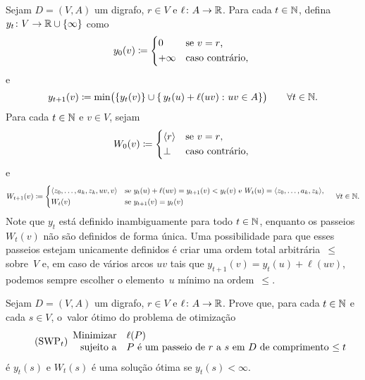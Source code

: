 \documentclass[10pt,reqno]{amsart}
\begin{document}
Sejam \(D = (V,A)\) um digrafo, \(r \in V\) e
\(\ell \colon A \to \mathbb{R}\).  Para cada \(t \in \mathbb{N}\), defina
\(y_t \colon V \to \mathbb{R} \cup \{\infty\}\) como
\begin{equation}
  \label{eq:7}
  y_0(v)
  \coloneqq
  \begin{cases*}
    0       & se \(v = r\),   \\
    +\infty & caso contrário, \\
  \end{cases*}
\end{equation}
e
\begin{equation}
  \label{eq:8}
  y_{t+1}(v)
  \coloneqq
  \min\paren[\big]{
    \set{y_t(v)}
    \cup
    \setst{
      y_t(u) + \ell(uv)
    }{
      uv \in A
    }}
  \qquad
  \forall t \in \Naturals.
\end{equation}
Para cada \(t \in \mathbb{N}\) e \(v \in V\), sejam
\begin{equation}
  \label{eq:9}
  W_0(v)
  \coloneqq
  \begin{cases*}
    \seq{r} & se \(v = r\),   \\
    \bot    & caso contrário, \\
  \end{cases*}
\end{equation}
e
\begin{equation}
  \label{eq:10}
  W_{t+1}(v)
  \coloneqq
  \begin{cases*}
    \seq{z_0,\dotsc,a_k,z_k,uv,v} & se \(y_t(u) + \ell(uv) =
    y_{t+1}(v) < y_t(v)\) e \(W_t(u) = \seq{z_0,\dotsc,a_k,z_k}\), \\
    W_t(v) & se \(y_{t+1}(v) = y_t(v)\) \\
  \end{cases*}
  \quad
  \forall t \in \Naturals.
\end{equation}
Note que \(y_t\) está definido inambiguamente para todo
\(t \in \mathbb{N}\), enquanto os passeios \(W_t(v)\) não são definidos
de forma única.  Uma possibilidade para que esses passeios estejam
unicamente definidos é criar uma ordem total arbitrária~\(\leq\)
sobre~\(V\) e, em caso de vários arcos \(uv\) tais que
\(y_{t+1}(v) = y_t(u) + \ell(uv)\), podemos sempre escolher o
elemento~\(u\) mínimo na ordem~\(\leq\).

\begin{exercise}
  \label{ex:5}
  Sejam \(D = (V,A)\) um digrafo, \(r \in V\) e
  \(\ell \colon A \to \mathbb{R}\).  Prove que, para cada
  \(t \in \mathbb{N}\) e cada \(s \in V\), o~valor ótimo do problema de
  otimização
  \begin{equation}
    \tag{SWP\({}_t\)}
    \begin{array}{{rl}}
      \text{Minimizar}   & \ell(P) \\
      \text{sujeito a} & \text{\(P\) é um passeio de \(r\) a \(s\) em~\(D\) de comprimento \(\leq t\)} \\
    \end{array}
  \end{equation}
  é \(y_t(s)\) e \(W_t(s)\) é uma solução ótima se
  \(y_t(s) < \infty\).
\end{exercise}
\end{document}
